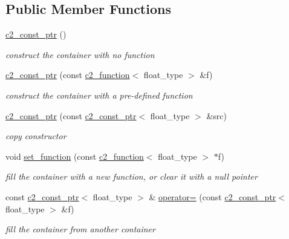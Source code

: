 \subsection*{Public Member Functions}
\begin{DoxyCompactItemize}
\item 
\hypertarget{classc2__const__ptr_a1f5f7e263b82efb9aa96e476c6ec21b1}{\hyperlink{classc2__const__ptr_a1f5f7e263b82efb9aa96e476c6ec21b1}{c2\-\_\-const\-\_\-ptr} ()}\label{classc2__const__ptr_a1f5f7e263b82efb9aa96e476c6ec21b1}

\begin{DoxyCompactList}\small\item\em construct the container with no function \end{DoxyCompactList}\item 
\hyperlink{classc2__const__ptr_a06e14fd555170fcd7c86ab7677961238}{c2\-\_\-const\-\_\-ptr} (const \hyperlink{classc2__function}{c2\-\_\-function}$<$ float\-\_\-type $>$ \&f)
\begin{DoxyCompactList}\small\item\em construct the container with a pre-\/defined function \end{DoxyCompactList}\item 
\hyperlink{classc2__const__ptr_abb60c8d3e444068e5ab618389dc0b82a}{c2\-\_\-const\-\_\-ptr} (const \hyperlink{classc2__const__ptr}{c2\-\_\-const\-\_\-ptr}$<$ float\-\_\-type $>$ \&src)
\begin{DoxyCompactList}\small\item\em copy constructor \end{DoxyCompactList}\item 
void \hyperlink{classc2__const__ptr_a2c7da9e9a936d57b2fb1a3cc7c636523}{set\-\_\-function} (const \hyperlink{classc2__function}{c2\-\_\-function}$<$ float\-\_\-type $>$ $\ast$f)
\begin{DoxyCompactList}\small\item\em fill the container with a new function, or clear it with a null pointer \end{DoxyCompactList}\item 
const \hyperlink{classc2__const__ptr}{c2\-\_\-const\-\_\-ptr}$<$ float\-\_\-type $>$ \& \hyperlink{classc2__const__ptr_a85155ba3652c0a1cba0a6d67d7b386dc}{operator=} (const \hyperlink{classc2__const__ptr}{c2\-\_\-const\-\_\-ptr}$<$ float\-\_\-type $>$ \&f)
\begin{DoxyCompactList}\small\item\em fill the container from another container \end{DoxyCompactList}\item 

\end{DoxyCompactItemize}
